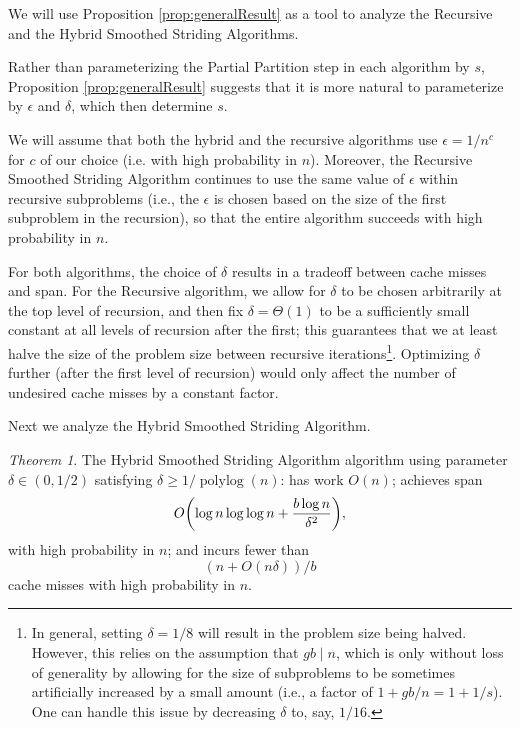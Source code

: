 \documentclass[11pt]{article}
\DeclarePairedDelimiter{\paren}{(}{)}
\newcommand{\polylog}{\operatorname{polylog}}
\theoremstyle{remark}
\newtheorem{theorem}{Theorem}[section]
\theoremstyle{remark}
\begin{document}
We will use Proposition \ref{prop:generalResult} as a tool to analyze the Recursive and the Hybrid Smoothed Striding Algorithms.

Rather than parameterizing the Partial Partition step in each algorithm by $s$, Proposition \ref{prop:generalResult} suggests that it is more natural to parameterize by $\epsilon$ and $\delta$, which then determine $s$.

We will assume that both the hybrid and the recursive algorithms use $\epsilon = 1/n^c$ for $c$ of our choice (i.e. with high probability in $n$). Moreover, the Recursive Smoothed Striding Algorithm continues to use the same value of $\epsilon$ within recursive subproblems (i.e., the $\epsilon$ is chosen based on the size of the first subproblem in the recursion), so that the entire algorithm succeeds with high probability in $n$.

For both algorithms, the choice of $\delta$ results in a tradeoff between cache misses and span. For the Recursive algorithm, we allow for $\delta$ to be chosen arbitrarily at the top level of recursion, and then fix $\delta  = \Theta(1)$ to be a sufficiently small constant at all levels of recursion after the first; this guarantees that we at least halve the size of the problem size between recursive iterations\footnote{In general, setting $\delta = 1/8$ will result in the problem size being halved. However, this relies on the assumption that $gb \mid n$, which is only without loss of generality by allowing for the size of subproblems to be sometimes artificially increased by a small amount (i.e., a factor of $1 + gb / n = 1 + 1/s$). One can handle this issue by decreasing $\delta$ to, say, $1/16$.}. Optimizing $\delta$ further (after the first level of recursion) would only affect the number of undesired cache misses by a constant factor.




Next we analyze the Hybrid Smoothed Striding Algorithm.
\begin{theorem}
	\label{thm:fullPartition}
	The Hybrid Smoothed Striding Algorithm algorithm using parameter $\delta\in(0,1/2)$ satisfying $\delta \ge 1/\polylog(n)$: has work $O(n)$; achieves span
        $$O\paren*{\log n \log\log n +\frac{b\log n}{\delta^2}},$$
with high probability in $n$; and incurs fewer than 
$$(n+O(n\delta))/b$$
cache misses with high probability in $n$.
\end{theorem}
\end{document}
